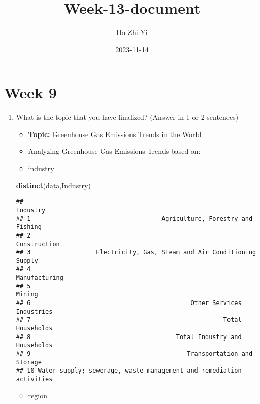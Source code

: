 \documentclass[
]{article}
\title{Week-13-document}
\author{Ho Zhi Yi}
\date{2023-11-14}
\newenvironment{Shaded}{\begin{snugshade}}{\end{snugshade}}
\newcommand{\FunctionTok}[1]{\textcolor[rgb]{0.13,0.29,0.53}{\textbf{#1}}}
\newcommand{\NormalTok}[1]{#1}
\providecommand{\tightlist}{%
  \setlength{\itemsep}{0pt}\setlength{\parskip}{0pt}}
\begin{document}
\maketitle

\hypertarget{week-9}{%
\section{\texorpdfstring{\textbf{Week 9}}{Week 9}}\label{week-9}}

\begin{enumerate}
\def\labelenumi{\arabic{enumi}.}
\item
  What is the topic that you have finalized? (Answer in 1 or 2
  sentences)

  \begin{itemize}
  \item
    \textbf{Topic:} Greenhouse Gas Emissions Trends in the World
  \item
    Analyzing Greenhouse Gas Emissions Trends based on:
  \item
    industry
  \end{itemize}

\begin{Shaded}
\begin{Highlighting}[]
\FunctionTok{distinct}\NormalTok{(data,Industry)}
\end{Highlighting}
\end{Shaded}

\begin{verbatim}
##                                                               Industry
## 1                                    Agriculture, Forestry and Fishing
## 2                                                         Construction
## 3                  Electricity, Gas, Steam and Air Conditioning Supply
## 4                                                        Manufacturing
## 5                                                               Mining
## 6                                            Other Services Industries
## 7                                                     Total Households
## 8                                        Total Industry and Households
## 9                                           Transportation and Storage
## 10 Water supply; sewerage, waste management and remediation activities
\end{verbatim}

  \begin{itemize}
  \tightlist
  \item
    region
  \end{itemize}


\end{enumerate}
\end{document}
